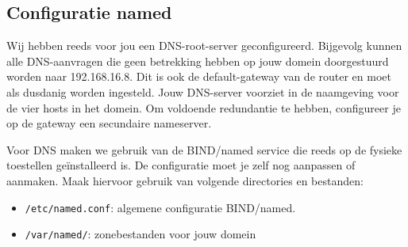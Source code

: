\documentclass{report}
\begin{document}
\subsection{Configuratie named}
 Wij hebben reeds voor jou een DNS-root-server geconfigureerd. Bijgevolg kunnen alle DNS-aanvragen die geen betrekking hebben op jouw domein doorgestuurd worden naar 192.168.16.8. Dit is ook de default-gateway van de router en moet als dusdanig worden ingesteld. Jouw DNS-server voorziet in de naamgeving voor de vier hosts in het domein. Om voldoende redundantie te hebben, configureer je op de gateway een secundaire nameserver.

Voor DNS maken we gebruik van de BIND/named service die reeds op de fysieke toestellen geïnstalleerd is. De configuratie moet je zelf nog aanpassen of aanmaken. Maak hiervoor gebruik van volgende directories en bestanden:

\begin{itemize}
	\item \texttt{/etc/named.conf}: algemene configuratie BIND/named.
	\item \texttt{/var/named/}: zonebestanden voor jouw domein
\end{itemize}
\end{document}
